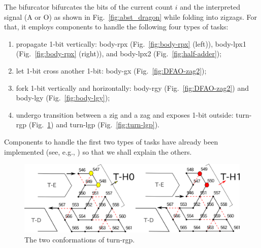 The bifurcator bifurcates the bits of the current count $i$ and the interpreted signal (A or O) as shown in Fig.~\ref{fig:abst_dragon} while folding into zigzags.
For that, it employs components to handle the following four types of tasks: 
\begin{enumerate}[itemsep=0pt]
\item propagate 1-bit vertically: body-rpx (Fig.~\ref{fig:body-rpx} (left)), body-lpx1 (Fig.~\ref{fig:body-rpx} (right)), and body-lpx2 (Fig.~\ref{fig:half-adder});
\item let 1-bit cross another 1-bit: body-gx (Fig.~\ref{fig:DFAO-zag2}); 
\item fork 1-bit vertically and horizontally: body-rgy (Fig.~\ref{fig:DFAO-zag2}) and body-lgy (Fig.~\ref{fig:body-lgy});  
\item undergo transition between a zig and a zag and exposes 1-bit outside: turn-rgp (Fig.~\ref{fig:turn-rgp}) and turn-lgp (Fig.~\ref{fig:turn-lgp}). 
\end{enumerate} 
Components to handle the first two types of tasks have already been implemented (see, e.g., \cite{HaKiOtSe2016}) so that we shall explain the others.


\begin{figure}
\vspace*{-5mm}
\centering
\includegraphics[width=\linewidth]{pic/turn-rgp.png}
\caption{The two conformations of turn-rgp.}
\label{fig:turn-rgp}
\vspace*{-3mm}
\end{figure}

